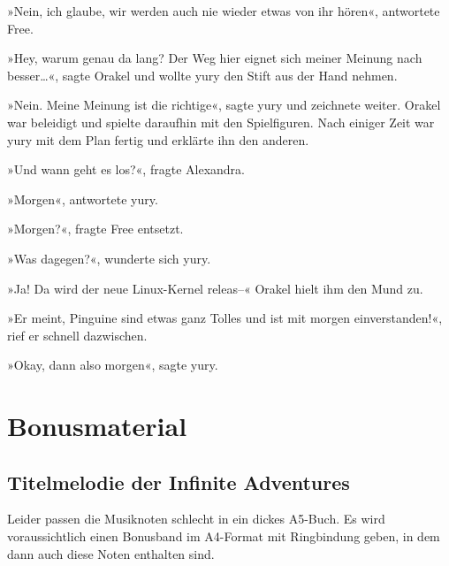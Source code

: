 »Nein, ich glaube, wir werden auch nie wieder etwas von ihr hören«, antwortete Free.

»Hey, warum genau da lang? Der Weg hier eignet sich meiner Meinung nach besser…«, sagte Orakel und wollte yury den Stift aus der Hand nehmen.

»Nein. Meine Meinung ist die richtige«, sagte yury und zeichnete weiter. Orakel war beleidigt und spielte daraufhin mit den Spielfiguren. Nach einiger Zeit war yury mit dem Plan fertig und erklärte ihn den anderen.

»Und wann geht es los?«, fragte Alexandra.

»Morgen«, antwortete yury.

»Morgen?«, fragte Free entsetzt.

»Was dagegen?«, wunderte sich yury.

»Ja! Da wird der neue Linux-Kernel releas–« Orakel hielt ihm den Mund zu.

»Er meint, Pinguine sind etwas ganz Tolles und ist mit morgen einverstanden!«, rief er schnell dazwischen.

»Okay, dann also morgen«, sagte yury.


\part{Bonusmaterial}

\chapter{Titelmelodie der Infinite Adventures}

Leider passen die Musiknoten schlecht in ein dickes A5-Buch. Es wird voraussichtlich einen Bonusband im A4-Format mit Ringbindung geben, in dem dann auch diese Noten enthalten sind.

